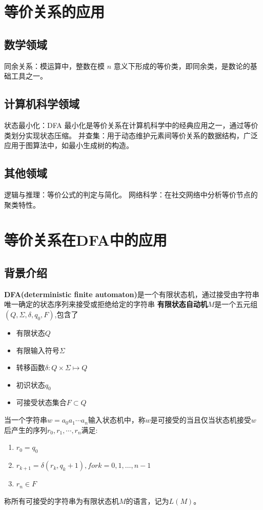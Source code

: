 \documentclass{article}
\begin{document}
\newpage
\section{等价关系的应用}
\subsection{数学领域}
同余关系：模运算中，整数在模 $n$ 意义下形成的等价类，即同余类，是数论的基础工具之一。

\subsection{计算机科学领域}
状态最小化：DFA 最小化是等价关系在计算机科学中的经典应用之一，通过等价类划分实现状态压缩。
并查集：用于动态维护元素间等价关系的数据结构，广泛应用于图算法中，如最小生成树的构造。

\subsection{其他领域}
逻辑与推理：等价公式的判定与简化。
网络科学：在社交网络中分析等价节点的聚类特性。


\newpage
\section{等价关系在DFA中的应用}
\subsection{背景介绍}
    \textbf{DFA(deterministic finite automaton)}是一个有限状态机，通过接受由字符串唯一确定的状态序列来接受或拒绝给定的字符串
    \textbf{有限状态自动机}$M$是一个五元组$(Q, \Sigma, \delta, q_0, F)$,包含了
    \begin{itemize}
        \item 有限状态$Q$
        \item 有限输入符号$\Sigma$
        \item 转移函数$\delta: Q \times \Sigma \mapsto Q$
        \item 初识状态$q_0$
        \item 可接受状态集合$F \subset Q$
    \end{itemize}
    当一个字符串$w = a_0a_1\cdots a_n$输入状态机中，称$w$是可接受的当且仅当状态机接受$w$后产生的序列$r_0, r_1, \cdots, r_n$满足:
    \begin{enumerate}
        \item $r_0 = q_0$
        \item $r_{k+1} = \delta(r_k, q_k+1), for k = 0, 1, \ldots, n-1$
        \item $r_n \in F$
    \end{enumerate}
    称所有可接受的字符串为有限状态机$M$的语言，记为$L(M)$。
    
\end{document}
